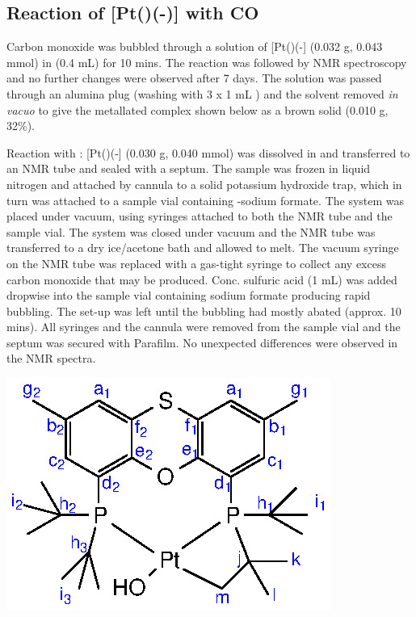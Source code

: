\subsection*{Reaction of \texorpdfstring{[Pt(\tButhixantphos)(-)]} P with CO}

Carbon monoxide was bubbled through a solution of [Pt(\tButhixantphos)(-] (0.032 g, 0.043 mmol) in  (0.4 mL) for 10 mins.  The reaction was followed by NMR spectroscopy and no further changes were observed after 7 days.  The solution was passed through an alumina plug (washing with 3 x 1 mL ) and the solvent removed \emph{in vacuo} to give the metallated complex shown below as a brown solid (0.010 g, 32\%).  

Reaction with :
[Pt(\tButhixantphos)(-] (0.030 g, 0.040 mmol) was dissolved in  and transferred to an NMR tube and sealed with a septum.  The sample was frozen in liquid nitrogen and attached by cannula to a solid potassium hydroxide trap, which in turn was attached to a sample vial containing \carbon{}-sodium formate.  The system was placed under vacuum, using syringes attached to both the NMR tube and the sample vial.  The system was closed under vacuum and the NMR tube was transferred to a dry ice/acetone bath and allowed to melt.  The vacuum syringe on the NMR tube was replaced with a gas-tight syringe to collect any excess carbon monoxide that may be produced.  Conc. sulfuric acid (1 mL) was added dropwise into the sample vial containing sodium formate producing rapid bubbling.  The set-up was left until the bubbling had mostly abated (approx. 10 mins).  All syringes and the cannula were removed from the sample vial and the septum was secured with Parafilm.  No unexpected differences were observed in the NMR spectra.  

\begin{structure}[h]
\begin{center}
\includegraphics{../Structures/Metallated.eps}
\end{center}
\end{structure}

